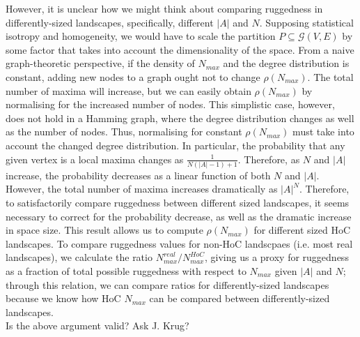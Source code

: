 \documentclass[10pt, reqno]{amsart}
\begin{document}
However, it is unclear how we might think about comparing ruggedness in differently-sized landscapes, specifically, different $|A|$ and $N$. Supposing statistical isotropy and homogeneity, we would have to scale the partition $P \subseteq \mathcal{G}(V,E)$ by some factor that takes into account the dimensionality of the space. From a naive graph-theoretic perspective, if the density of $N_{max}$ and the degree distribution is constant, adding new nodes to a graph ought not to change $\rho(N_{max})$. The total number of maxima will increase, but we can easily obtain $\rho(N_{max})$ by normalising for the increased number of nodes. This simplistic case, however, does not hold in a Hamming graph, where the degree distribution changes as well as the number of nodes. Thus, normalising for constant $\rho(N_{max})$ must take into account the changed degree distribution. In particular, the probability that any given vertex is a local maxima changes as $ \frac{1}{N(|A|-1)+1} $. Therefore, as $N$ and $|A|$ increase, the probability decreases as a linear function of both $N$ and $|A|$. However, the total number of maxima increases dramatically as $|A|^N$. Therefore, to satisfactorily compare ruggedness between different sized landscapes, it seems necessary to correct for the probability decrease, as well as the dramatic increase in space size. This result allows us to compute $\rho(N_{max})$ for different sized HoC landscapes. To compare ruggedness values for non-HoC landscpaes (i.e. most real landscapes), we calculate the ratio $N_{max}^{real}/N_{max}^{HoC}$, giving us a proxy for ruggedness as a fraction of total possible ruggedness with respect to $N_{max}$ given $|A|$ and $N$; through this relation, we can compare ratios for differently-sized landscapes because we know how HoC $N_{max}$ can be compared between differently-sized landscapes. \\

Is the above argument valid? Ask J. Krug? \\
\end{document}
